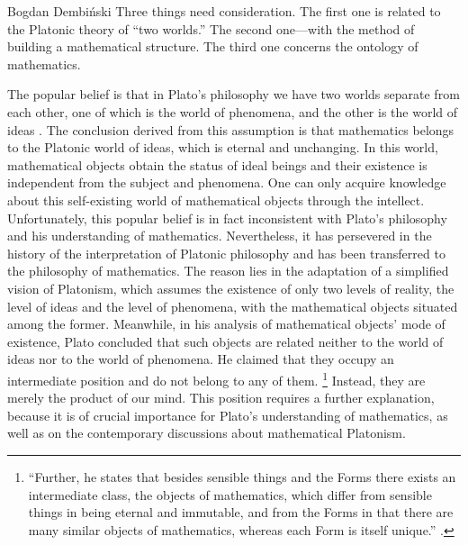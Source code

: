 \begin{artengenv}{Bogdan Dembiński}
Three things need consideration. The first one is related to the Platonic theory of ``two
worlds.'' The second one---with the method of building a mathematical structure. The third one
concerns the ontology of mathematics.

The popular belief is that in Plato’s philosophy we have two worlds separate from each other, one of which is the world
of phenomena, and the other is the world of ideas
\parencite{dembinski_streit_2007}.
The conclusion derived
from this assumption is that mathematics belongs to the Platonic world of ideas, which is eternal and unchanging. In
this world, mathematical objects obtain the status of ideal beings and their existence is independent from the
subject and phenomena. One can only acquire knowledge about this self-existing world of mathematical objects through
the intellect. Unfortunately, this popular belief is in fact inconsistent with Plato’s philosophy and his understanding
of mathematics. Nevertheless, it has persevered in the history of the interpretation of Platonic philosophy and
has been transferred to the philosophy of mathematics. The reason lies in the adaptation of a simplified
vision of Platonism, which assumes the existence of only two levels of reality, the level of ideas and the level of
phenomena, with the mathematical objects situated among the former. Meanwhile, in his analysis of mathematical objects'
mode of existence, Plato concluded that such objects are related neither to the world of ideas nor to the world of
phenomena. He claimed that they occupy an intermediate position and do not belong to any of them.
\footnote{``Further, he states that besides sensible things and the Forms there exists an intermediate class,
the objects of mathematics, which differ from sensible things in being eternal and immutable,
and from the Forms in that there
are many similar objects of mathematics, whereas each Form is itself unique.''
\parencite[987b]{aristotle_aristotles_1924}.
}
Instead, they are merely the product of our mind. This position requires a further explanation, because it is of
crucial importance for Plato’s understanding of mathematics, as well as on the contemporary discussions about
mathematical Platonism.


\end{artengenv}
